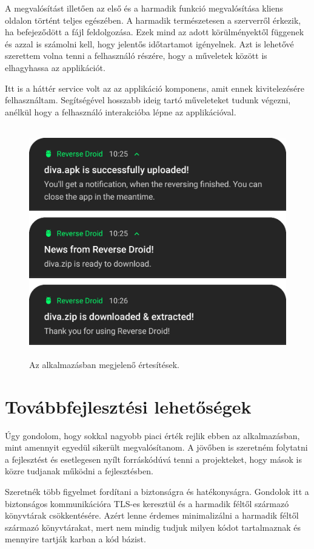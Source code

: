 \documentclass{thesis-ekf}
\theoremstyle{definition}
\theoremstyle{remark}
\begin{document}
A megvalósítást illetően az első és a harmadik funkció megvalósítása kliens oldalon történt teljes egészében.
A harmadik természetesen a szerverről érkezik, ha befejeződött a fájl feldolgozása.
Ezek mind az adott körülményektől függenek és azzal is számolni kell, hogy jelentős időtartamot igényelnek.
Azt is lehetővé szerettem volna tenni a felhasználó részére, hogy a műveletek között is elhagyhassa az applikációt.

Itt is a háttér service volt az az applikáció komponens, amit ennek kivitelezésére felhasználtam.
Segítségével hosszabb ideig tartó műveleteket tudunk végezni, anélkül hogy a felhasználó interakcióba lépne az applikációval.

\begin{figure}[!h]
	\centering
	\includegraphics[height=10cm]{pictures/notifications}
	\caption{Az alkalmazásban megjelenő értesítések.}
	\label{notifications}
\end{figure}

\chapter{Továbbfejlesztési lehetőségek}\label{lehetosegek}

Úgy gondolom, hogy sokkal nagyobb piaci érték rejlik ebben az alkalmazásban, mint amennyit egyedül sikerült megvalósítanom.
A jövőben is szeretném folytatni a fejlesztést és esetlegesen nyílt forráskódúvá tenni a projekteket, hogy mások is közre tudjanak működni a fejlesztésben.

Szeretnék több figyelmet fordítani a biztonságra és hatékonyságra. 
Gondolok itt a biztonságos kommunikációra TLS-es keresztül és a harmadik féltől származó könyvtárak csökkentésére.
Azért lenne érdemes minimalizálni a harmadik féltől származó könyvtárakat, mert nem mindig tudjuk milyen kódot tartalmaznak és mennyire tartják karban a kód bázist.
\end{document}
